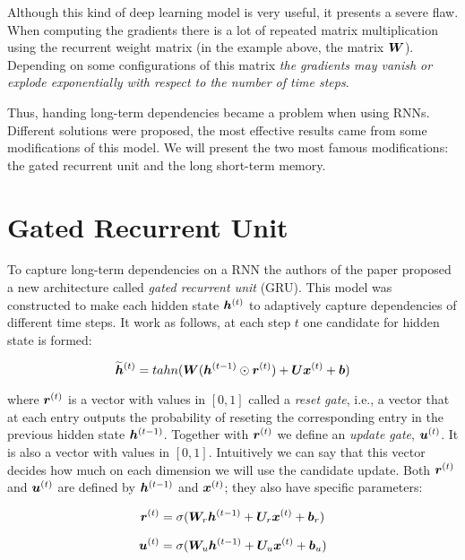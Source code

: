 Although this kind of deep learning model is very useful, it presents a severe flaw. When computing the gradients there is a lot of repeated matrix multiplication using the recurrent weight matrix (in the example above, the matrix $\bm{W}$). Depending on some configurations of this matrix \textit{the gradients may vanish or explode exponentially with respect to the number of time steps}.

Thus, handing long-term dependencies became a problem when using RNNs. Different solutions were proposed, the most effective results came from some modifications of this model. We will present the two most famous modifications: the gated recurrent unit and the long short-term memory. 

\section{Gated Recurrent Unit}
\label{sec:GRU}

To capture long-term dependencies on a RNN  the authors of the paper \cite{ChungGCB14}  proposed a new architecture called \textit{gated recurrent unit} (GRU). This model was constructed to make each hidden state  $\bm{h}^{(t)}$ to adaptively capture dependencies of different time steps. It work as follows, at each step $t$ one candidate for hidden state is formed:

\begin{equation}
\bm{\widetilde{h}}^{(t)} = tahn(\bm{W} (\bm{h}^{(t-1)} \odot  \bm{r}^{(t)}) + \bm{U} \bm{x}^{(t)} + \bm{b})
\end{equation}


where $\bm{r}^{(t)}$ is a vector with values in $[0, 1]$ called a \textit{reset gate}, i.e.,  a vector that at each entry outputs the probability of reseting the  corresponding entry in the previous hidden state $\bm{h}^{(t-1)}$. Together with $\bm{r}^{(t)}$ we define an \textit{update gate}, $\bm{u}^{(t)}$. It is also a vector with values in $[0, 1]$. Intuitively we can say that this vector decides how much on each dimension we will use the candidate update. Both $\bm{r}^{(t)}$ and $\bm{u}^{(t)}$ are defined by $\bm{h}^{(t-1)}$ and $\bm{x}^{(t)}$; they also have specific parameters:

\begin{equation}
\bm{r}^{(t)} = \sigma(\bm{W}_{r} \bm{h}^{(t-1)} + \bm{U}_{r} \bm{x}^{(t)} + \bm{b}_{r})
\end{equation}


\begin{equation}
\bm{u}^{(t)} = \sigma(\bm{W}_{u} \bm{h}^{(t-1)} + \bm{U}_{u} \bm{x}^{(t)} + \bm{b}_{u})
\end{equation}


